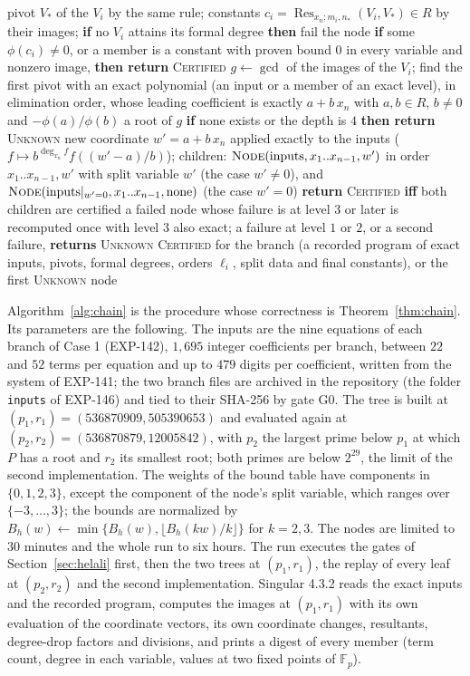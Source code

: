 \documentclass[11pt]{article}
\theoremstyle{remark}
\begin{document}
\begin{algorithm}[t]
\begin{algorithmic}[1]
\State \quad pivot $V_\ast$ of the $V_i$ by the same rule; constants $c_i=\operatorname{Res}_{x_n;m_i,n_\ast}(V_i,V_\ast)\in R$ by their images; \textbf{if} no $V_i$ attains its formal degree \textbf{then} fail the node
\State \quad \textbf{if} some $\phi(c_i)\ne0$, or a member is a constant with proven bound $0$ in every variable and nonzero image, \textbf{then return} \textsc{Certified}
\State \quad $g\leftarrow\gcd$ of the images of the $V_i$; find the first pivot with an exact polynomial (an input or a member of an exact level), in elimination order, whose leading coefficient is exactly $a+b\,x_n$ with $a,b\in R$, $b\ne0$ and $-\phi(a)/\phi(b)$ a root of $g$
\State \quad \textbf{if} none exists or the depth is $4$ \textbf{then return} \textsc{Unknown}
\State \quad new coordinate $w'=a+b\,x_n$ applied exactly to the inputs ($f\mapsto b^{\deg_{x_n}f}f((w'-a)/b)$); children: $\textsc{Node}(\text{inputs},x_1..x_{n-1},w')$ in order $x_1..x_{n-1},w'$ with split variable $w'$ (the case $w'\ne0$), and $\textsc{Node}(\text{inputs}|_{w'=0},x_1..x_{n-1},\text{none})$ (the case $w'=0$)
\State \quad \textbf{return} \textsc{Certified} \textbf{iff} both children are certified
\State a failed node whose failure is at level $3$ or later is recomputed once with level $3$ also exact; a failure at level $1$ or $2$, or a second failure, \textbf{returns} \textsc{Unknown}
\Ensure \textsc{Certified} for the branch (a recorded program of exact inputs, pivots, formal degrees, orders $\ell_i$, split data and final constants), or the first \textsc{Unknown} node
\end{algorithmic}
\end{algorithm}

Algorithm~\ref{alg:chain} is the procedure whose correctness is Theorem~\ref{thm:chain}. Its parameters are the following. The inputs are the nine equations of each branch of
Case 1 (EXP-142), $1{,}695$ integer coefficients per branch, between $22$ and $52$ terms per equation and up to $479$ digits per coefficient, written from the system of EXP-141; the two branch files are archived in the repository (the folder \texttt{inputs} of EXP-146) and tied to their SHA-256 by gate G0. The tree is built at $(p_1,r_1)=(536870909,505390653)$ and evaluated again at $(p_2,r_2)=(536870879,12005842)$, with $p_2$ the largest prime below $p_1$ at which $P$ has a root and
$r_2$ its smallest root; both primes are below $2^{29}$, the limit of the second implementation. The weights of the bound table have components in $\{0,1,2,3\}$, except the component of the node's split variable, which ranges over
$\{-3,\dots,3\}$; the bounds are normalized by $B_h(w)\leftarrow\min\{B_h(w),\lfloor B_h(kw)/k\rfloor\}$ for $k=2,3$. The nodes are limited to $30$ minutes and the whole run to six hours. The run executes the gates of
Section~\ref{sec:helali} first, then the two trees at $(p_1,r_1)$, the replay of every leaf at $(p_2,r_2)$ and the second implementation. Singular 4.3.2 reads the exact inputs and the recorded program, computes the images at $(p_1,r_1)$ with its own evaluation of the coordinate
vectors, its own coordinate changes, resultants, degree-drop factors and divisions, and prints a digest of every member (term count, degree in each variable, values at two fixed points of $\mathbb F_p$).
\end{document}
